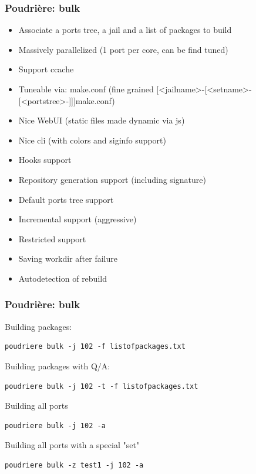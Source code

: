 \begin{frame}
	\frametitle{Poudrière: bulk}
	\begin{itemize}
			\pause
		\item Associate a ports tree, a jail and a list of packages to build
			\pause
		\item Massively parallelized (1 port per core, can be find tuned)
			\pause
		\item Support ccache
			\pause
		\item Tuneable via: make.conf (fine grained [<jailname>-[<setname>-[<portstree>-]]]make.conf)
			\pause
		\item Nice WebUI (static files made dynamic via js)
			\pause
		\item Nice cli (with colors and siginfo support)
			\pause
		\item Hooks support
			\pause
		\item Repository generation support (including signature)
			\pause
		\item Default ports tree support
			\pause
		\item Incremental support (aggressive)
			\pause
		\item Restricted support
			\pause
		\item Saving workdir after failure
			\pause
		\item Autodetection of rebuild
			\pause
	\end{itemize}
\end{frame}

\begin{frame}[fragile]
	\frametitle{Poudrière: bulk}
	Building packages:
	\begin{lstlisting}
poudriere bulk -j 102 -f listofpackages.txt
\end{lstlisting}
	Building packages with Q/A:
	\begin{lstlisting}
poudriere bulk -j 102 -t -f listofpackages.txt
\end{lstlisting}
	Building all ports
	\begin{lstlisting}
poudriere bulk -j 102 -a
\end{lstlisting}
	Building all ports with a special "set"
	\begin{lstlisting}
poudriere bulk -z test1 -j 102 -a
\end{lstlisting}
\end{frame}

